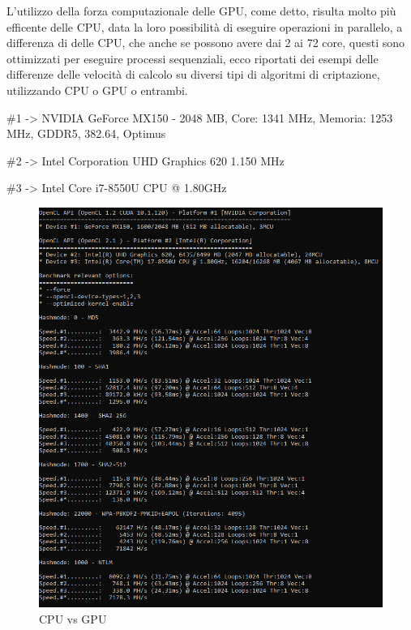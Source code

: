 \newpage

L'utilizzo della forza computazionale delle GPU, come detto, risulta molto più efficente delle CPU, data la loro possibilità di eseguire operazioni in parallelo, a differenza di delle CPU, che anche se possono avere dai 2 ai 72 core, questi sono ottimizzati per eseguire processi sequenziali, ecco riportati dei esempi delle differenze delle velocità di calcolo su diversi tipi di algoritmi di criptazione, utilizzando CPU o GPU o entrambi.
\newline

\#1 -> NVIDIA GeForce MX150 - 2048 MB, Core: 1341 MHz, Memoria: 1253 MHz, GDDR5, 382.64, Optimus

\#2 -> Intel Corporation UHD Graphics 620 1.150 MHz

\#3 -> Intel Core i7-8550U CPU @ 1.80GHz

\begin{figure}[ht]
    \centering
    \includegraphics[width=\linewidth]{Immagini/7/cpu_gpu.PNG}
    \caption{CPU vs GPU}
    \label{fig:CPU vs GPU}
\end{figure}

\label{chap:conc}